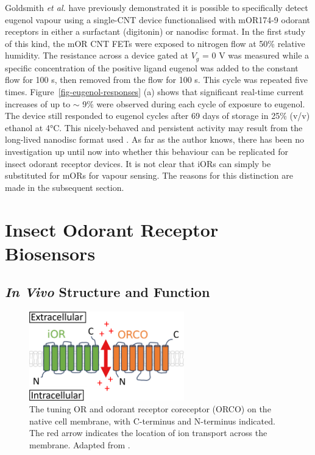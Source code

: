 \documentclass[
  a4paper,
]{scrbook}
\begin{document}
Goldsmith \emph{et al.} have previously demonstrated it is possible to
specifically detect eugenol vapour using a single-CNT device
functionalised with mOR174-9 odorant receptors in either a surfactant
(digitonin) or nanodisc format. In the first study of this kind, the mOR
CNT FETs were exposed to nitrogen flow at 50\% relative humidity. The
resistance across a device gated at \(V_g\) = 0 V was measured while a
specific concentration of the positive ligand eugenol was added to the
constant flow for 100 s, then removed from the flow for 100 s. This
cycle was repeated five times. Figure~\ref{fig-eugenol-responses} (a)
shows that significant real-time current increases of up to \(\sim\) 9\%
were observed during each cycle of exposure to eugenol. The device still
responded to eugenol cycles after 69 days of storage in 25\% (v/v)
ethanol at 4°C. This nicely-behaved and persistent activity may result
from the long-lived nanodisc format used \autocite{Goldsmith2011}. As
far as the author knows, there has been no investigation up until now
into whether this behaviour can be replicated for insect odorant
receptor devices. It is not clear that iORs can simply be substituted
for mORs for vapour sensing. The reasons for this distinction are made
in the subsequent section.

\hypertarget{insect-odorant-receptor-biosensors}{%
\section{Insect Odorant Receptor
Biosensors}\label{insect-odorant-receptor-biosensors}}

\hypertarget{in-vivo-structure-and-function-1}{%
\subsection{\texorpdfstring{\emph{In Vivo} Structure and
Function}{In Vivo Structure and Function}}\label{in-vivo-structure-and-function-1}}

\begin{figure}

{\centering \includegraphics[width=0.6\textwidth,height=\textheight]{figures/ch3/OR_diagram.png}

}

\caption{\label{fig-iOR-membrane}The tuning OR and odorant receptor
coreceptor (ORCO) on the native cell membrane, with C-terminus and
N-terminus indicated. The red arrow indicates the location of ion
transport across the membrane. Adapted from
\autocite{Wicher2008,Brito2016}.}

\end{figure}
\end{document}
